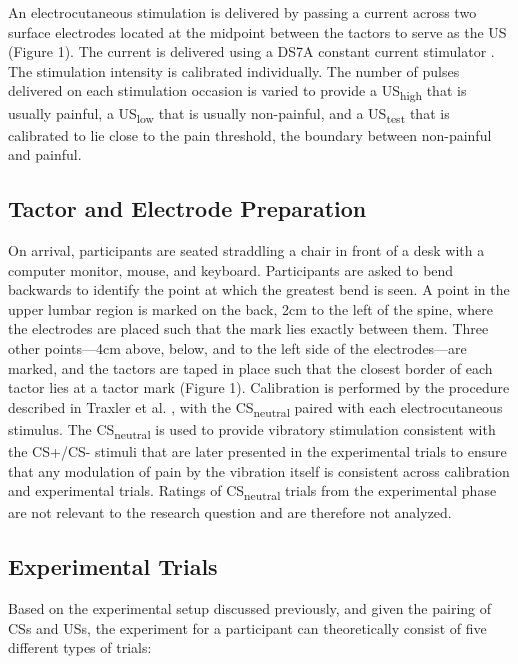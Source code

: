 \documentclass[empirical,issue, twocolumn,authordate]{jote-new-article}
\begin{document}
An electrocutaneous stimulation is delivered by passing a current across two surface electrodes located at the midpoint between the tactors to serve as the US (Figure 1). The current is delivered using a DS7A constant current stimulator \parencite{Digitimer Limited0}. The stimulation intensity is calibrated individually. The number of pulses delivered on each stimulation occasion is varied to provide a US\textsubscript{high} that is usually painful, a US\textsubscript{low} that is usually non-painful, and a US\textsubscript{test} that is calibrated to lie close to the pain threshold, the boundary between non-painful and painful.

\subsection{Tactor and Electrode Preparation}

On arrival, participants are seated straddling a chair in front of a desk with a computer monitor, mouse, and keyboard. Participants are asked to bend backwards to identify the point at which the greatest bend is seen. A point in the upper lumbar region is marked on the back, 2cm to the left of the spine, where the electrodes are placed such that the mark lies exactly between them. Three other points—4cm above, below, and to the left side of the electrodes—are marked, and the tactors are taped in place such that the closest border of each tactor lies at a tactor mark (Figure 1). Calibration is performed by the procedure described in Traxler et al. \parencite{Traxler2019}, with the CS\textsubscript{neutral} paired with each electrocutaneous stimulus. The CS\textsubscript{neutral} is used to provide vibratory stimulation consistent with the CS+/CS- stimuli that are later presented in the experimental trials to ensure that any modulation of pain by the vibration itself is consistent across calibration and experimental trials. Ratings of CS\textsubscript{neutral} trials from the experimental phase are not relevant to the research question and are therefore not analyzed.

\subsection{Experimental Trials}

Based on the experimental setup discussed previously, and given the pairing of CSs and USs, the experiment for a participant can theoretically consist of five different types of trials:
\end{document}
